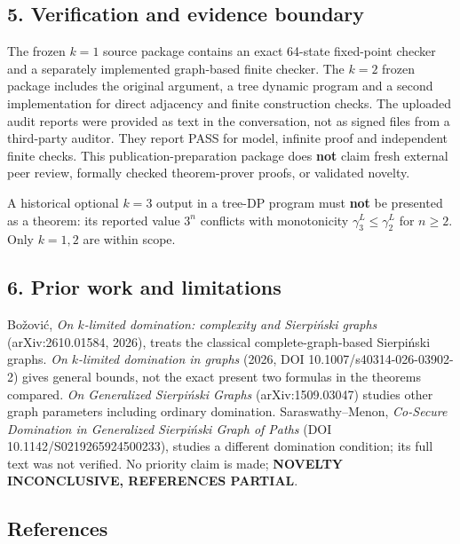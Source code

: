 \documentclass[
  11pt,
]{article}
\begin{document}
\subsection{5. Verification and evidence
boundary}\label{verification-and-evidence-boundary}

The frozen \(k=1\) source package contains an exact 64-state fixed-point
checker and a separately implemented graph-based finite checker. The
\(k=2\) frozen package includes the original argument, a tree dynamic
program and a second implementation for direct adjacency and finite
construction checks. The uploaded audit reports were provided as text in
the conversation, not as signed files from a third-party auditor. They
report PASS for model, infinite proof and independent finite checks.
This publication-preparation package does \textbf{not} claim fresh
external peer review, formally checked theorem-prover proofs, or
validated novelty.

A historical optional \(k=3\) output in a tree-DP program must
\textbf{not} be presented as a theorem: its reported value \(3^n\)
conflicts with monotonicity \(\gamma_3^L\le\gamma_2^L\) for \(n\ge2\).
Only \(k=1,2\) are within scope.

\subsection{6. Prior work and
limitations}\label{prior-work-and-limitations}

Božović, \emph{On \(k\)-limited domination: complexity and Sierpiński
graphs} (arXiv:2610.01584, 2026), treats the classical
complete-graph-based Sierpiński graphs. \emph{On \(k\)-limited
domination in graphs} (2026, DOI 10.1007/s40314-026-03902-2) gives
general bounds, not the exact present two formulas in the theorems
compared. \emph{On Generalized Sierpiński Graphs} (arXiv:1509.03047)
studies other graph parameters including ordinary domination.
Saraswathy--Menon, \emph{Co-Secure Domination in Generalized Sierpiński
Graph of Paths} (DOI 10.1142/S0219265924500233), studies a different
domination condition; its full text was not verified. No priority claim
is made; \textbf{NOVELTY INCONCLUSIVE, REFERENCES PARTIAL}.

\subsection{References}\label{references}
\end{document}
